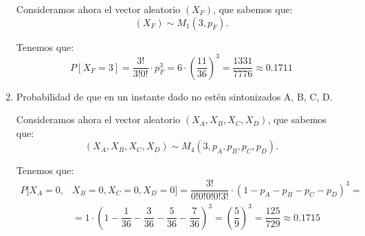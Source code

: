 \begin{ejercicio}
\begin{enumerate}
        Consideramos ahora el vector aleatorio $(X_F)$, que sabemos que:
        \begin{equation*}
            (X_F) \sim M_1\left(3,p_F\right).
        \end{equation*}

        Tenemos que:
        \begin{equation*}
            P[X_F = 3] = \dfrac{3!}{3!0!}\cdot p_F^3 = 6\cdot \left(\dfrac{11}{36}\right)^3 = \dfrac{1331}{7776} \approx 0.1711
        \end{equation*}

        \item Probabilidad de que en un instante dado no estén sintonizados A, B, C, D.
        
        Consideramos ahora el vector aleatorio $(X_A,X_B,X_C,X_D)$, que sabemos que:
        \begin{equation*}
            (X_A,X_B,X_C,X_D) \sim M_4\left(3,p_A,p_B,p_C,p_D\right).
        \end{equation*}

        Tenemos que:
        \begin{align*}
            P[X_A = 0,&X_B = 0,X_C = 0,X_D = 0] = \dfrac{3!}{0!0!0!0!3!}\cdot \left(1-p_A-p_B-p_C-p_D\right)^3 =\\&= 1\cdot \left(1-\dfrac{1}{36}-\dfrac{3}{36}-\dfrac{5}{36}-\dfrac{7}{36}\right)^3 = \left(\dfrac{5}{9}\right)^3 = \dfrac{125}{729} \approx 0.1715
        \end{align*}
    \end{enumerate}
\end{ejercicio}

